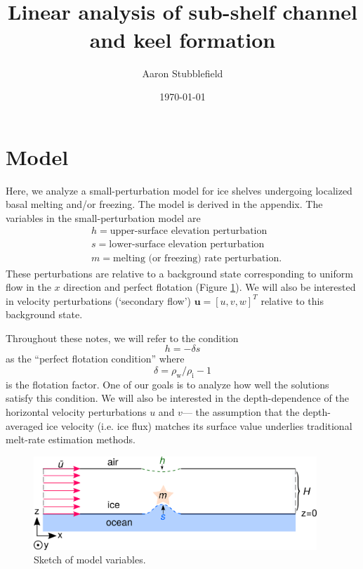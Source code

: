 \documentclass[paper=a4, fontsize=11pt]{article} %
\title{
\horrule{1pt} \\[0.4cm] %
 \Large Linear analysis of sub-shelf channel and keel formation
\horrule{1pt} \\[0.5cm] %
}
\author{Aaron Stubblefield} %
\date{\small\today} %
\begin{document}
\maketitle %

\setcounter{footnote}{1}

\section{Model}
Here, we analyze a small-perturbation model for ice shelves undergoing localized basal melting and/or freezing.
The model is derived in the appendix.
The variables in the small-perturbation model are
\begin{align*}
&h = \text{upper-surface elevation perturbation}\\
&s = \text{lower-surface elevation perturbation}\\
&m = \text{melting (or freezing) rate perturbation}.
\end{align*}
These perturbations are relative to a background state corresponding to uniform
flow in the $x$ direction and perfect flotation (Figure \ref{fig:sketch}). We will also be interested in velocity perturbations (`secondary flow')
$\pmb{u}=[u,v,w]^T$ relative to this background state.

Throughout these notes, we will refer to the condition $$h=-\delta s$$ as the ``perfect
flotation condition'' where $$\delta = \rho_\mathrm{w}/\rho_\mathrm{i}-1$$
is the flotation factor. One of our goals is to analyze how well the solutions satisfy this condition.
We will also be interested in the depth-dependence of the horizontal velocity perturbations $u$ and $v$---
the assumption that the depth-averaged ice velocity (i.e. ice flux) matches
its surface value underlies traditional melt-rate estimation methods.


\begin{figure}
  \centering
\includegraphics[width=0.95\textwidth]{figs/fig1.png}
\caption{Sketch of model variables.}
\label{fig:sketch}
\end{figure}
\end{document}
